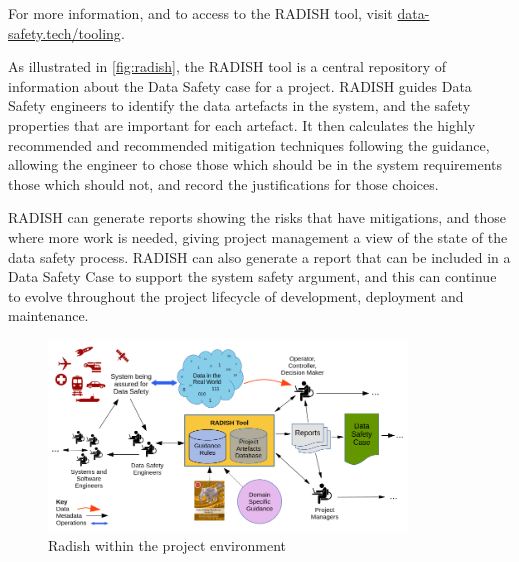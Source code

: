 For more information, and to access to the RADISH tool, visit \href{https://data-safety.tech/tooling}{data-safety.tech/tooling}.

As illustrated in \autoref{fig:radish}, the RADISH tool is a central repository of information about the Data Safety case for a project. RADISH guides Data Safety engineers to identify the data artefacts in the system, and the safety properties that are important for each artefact. It then calculates the highly recommended and recommended mitigation techniques following the guidance, allowing the engineer to chose those which should be in the system requirements those which should not, and record the justifications for those choices.

RADISH can generate reports showing the risks that have mitigations, and those where more work is needed, giving project management a view of the state of the data safety process. RADISH can also generate a report that can be included in a Data Safety Case to support the system safety argument, and this can continue to evolve throughout the project lifecycle of development, deployment and maintenance.

\begin{figure}[htbp]
  \centering
  \includegraphics[width=0.85\textwidth]{images/RADISHToolInProjectEnvironment-v02-landscape}
  \caption{Radish within the project environment}
  \label{fig:radish}
\end{figure}

\cbend

